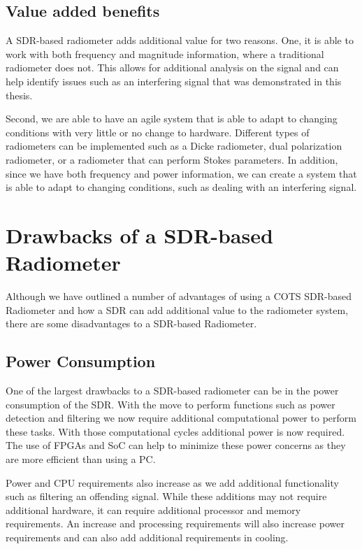 {\subsection{Value added benefits}

A SDR-based radiometer adds additional value for two reasons.  One, it is able to work with both frequency and magnitude information, where a traditional radiometer does not.  This allows for additional analysis on the signal and can help identify issues such as an interfering signal that was demonstrated in this thesis.  

Second, we are able to have an agile system that is able to adapt to changing conditions with very little or no change to hardware.  Different types of radiometers can be implemented such as a Dicke radiometer, dual polarization radiometer, or a radiometer that can perform Stokes parameters.  In addition, since we have both frequency and power information, we can create a system that is able to adapt to changing conditions, such as dealing with an interfering signal.  

\section{Drawbacks of a SDR-based Radiometer}
Although we have outlined a number of advantages of using a COTS SDR-based Radiometer and how a SDR can add additional value to the radiometer system, there are some disadvantages to a SDR-based Radiometer.

\subsection{Power Consumption}
One of the largest drawbacks to a SDR-based radiometer can be in the power consumption of the SDR.  With the move to perform functions such as power detection and filtering we now require additional computational power to perform these tasks.  With those computational cycles additional power is now required.  The use of FPGAs and SoC can help to minimize these power concerns as they are more efficient than using a PC.  

Power and CPU requirements also increase as we add additional functionality such as filtering an offending signal.  While these additions may not require additional hardware, it can require additional processor and memory requirements.  An increase and processing requirements will also increase power requirements and can also add additional requirements in cooling.

}
